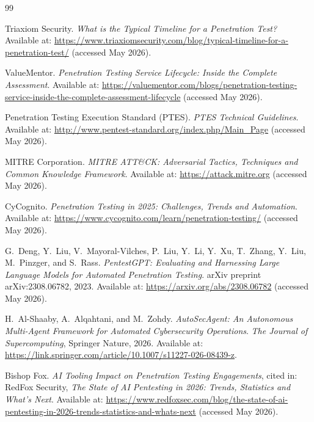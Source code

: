\documentclass[12pt,a4paper]{report}
\begin{document}
\cleardoublepage
{}
\renewcommand{\bibname}{Bibliography}
\begin{thebibliography}{99}


Triaxiom Security.
\textit{What is the Typical Timeline for a Penetration Test?}
Available at: \url{https://www.triaxiomsecurity.com/blog/typical-timeline-for-a-penetration-test/}
(accessed May 2026).

ValueMentor.
\textit{Penetration Testing Service Lifecycle: Inside the Complete Assessment}.
Available at: \url{https://valuementor.com/blogs/penetration-testing-service-inside-the-complete-assessment-lifecycle}
(accessed May 2026).

Penetration Testing Execution Standard (PTES).
\textit{PTES Technical Guidelines}.
Available at: \url{http://www.pentest-standard.org/index.php/Main_Page}
(accessed May 2026).

MITRE Corporation.
\textit{MITRE ATT\&CK: Adversarial Tactics, Techniques and Common Knowledge Framework}.
Available at: \url{https://attack.mitre.org}
(accessed May 2026).

CyCognito.
\textit{Penetration Testing in 2025: Challenges, Trends and Automation}.
Available at: \url{https://www.cycognito.com/learn/penetration-testing/}
(accessed May 2026).


G.~Deng, Y.~Liu, V.~Mayoral-Vilches, P.~Liu, Y.~Li, Y.~Xu, T.~Zhang,
Y.~Liu, M.~Pinzger, and S.~Rass.
\textit{PentestGPT: Evaluating and Harnessing Large Language Models for
Automated Penetration Testing}.
arXiv preprint arXiv:2308.06782, 2023.
Available at: \url{https://arxiv.org/abs/2308.06782}
(accessed May 2026).

H.~Al-Shaaby, A.~Alqahtani, and M.~Zohdy.
\textit{AutoSecAgent: An Autonomous Multi-Agent Framework for Automated
Cybersecurity Operations}.
\textit{The Journal of Supercomputing}, Springer Nature, 2026.
Available at: \url{https://link.springer.com/article/10.1007/s11227-026-08439-z}.

Bishop Fox.
\textit{AI Tooling Impact on Penetration Testing Engagements},
cited in: RedFox Security, \textit{The State of AI Pentesting in 2026:
Trends, Statistics and What's Next}.
Available at: \url{https://www.redfoxsec.com/blog/the-state-of-ai-pentesting-in-2026-trends-statistics-and-whats-next}
(accessed May 2026).


\end{thebibliography}
\end{document}
